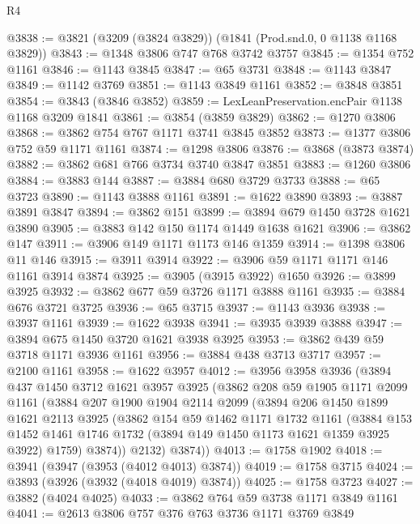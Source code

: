 \begin{lexlean}{R4}
\begin{coremodule}
@3838 := @3821 (@3209 (@3824 @3829)) (@1841 (Prod.snd.{0, 0} @1138 @1168 @3829))
@3843 := @1348 @3806 @747 @768 @3742 @3757
@3845 := @1354 @752 @1161
@3846 := @1143 @3845
@3847 := @65 @3731
@3848 := @1143 @3847
@3849 := @1142 @3769
@3851 := @1143 @3849 @1161
@3852 := @3848 @3851
@3854 := @3843 (@3846 @3852)
@3859 := LexLeanPreservation.encPair @1138 @1168 @3209 @1841
@3861 := @3854 (@3859 @3829)
@3862 := @1270 @3806
@3868 := @3862 @754 @767 @1171 @3741 @3845 @3852
@3873 := @1377 @3806 @752 @59 @1171 @1161
@3874 := @1298 @3806
@3876 := @3868 (@3873 @3874)
@3882 := @3862 @681 @766 @3734 @3740 @3847 @3851
@3883 := @1260 @3806
@3884 := @3883 @144
@3887 := @3884 @680 @3729 @3733
@3888 := @65 @3723
@3890 := @1143 @3888 @1161
@3891 := @1622 @3890
@3893 := @3887 @3891 @3847
@3894 := @3862 @151
@3899 := @3894 @679 @1450 @3728 @1621 @3890
@3905 := @3883 @142 @150 @1174 @1449 @1638 @1621
@3906 := @3862 @147
@3911 := @3906 @149 @1171 @1173 @146 @1359
@3914 := @1398 @3806 @11 @146
@3915 := @3911 @3914
@3922 := @3906 @59 @1171 @1171 @146 @1161 @3914 @3874
@3925 := @3905 (@3915 @3922) @1650
@3926 := @3899 @3925
@3932 := @3862 @677 @59 @3726 @1171 @3888 @1161
@3935 := @3884 @676 @3721 @3725
@3936 := @65 @3715
@3937 := @1143 @3936
@3938 := @3937 @1161
@3939 := @1622 @3938
@3941 := @3935 @3939 @3888
@3947 := @3894 @675 @1450 @3720 @1621 @3938 @3925
@3953 := @3862 @439 @59 @3718 @1171 @3936 @1161
@3956 := @3884 @438 @3713 @3717
@3957 := @2100 @1161
@3958 := @1622 @3957
@4012 := @3956
    @3958
    @3936
    (@3894
      @437
      @1450
      @3712
      @1621
      @3957
      @3925
      (@3862
        @208
        @59
        @1905
        @1171
        @2099
        @1161
        (@3884
          @207
          @1900
          @1904
          @2114
          @2099
          (@3894
            @206
            @1450
            @1899
            @1621
            @2113
            @3925
            (@3862
              @154
              @59
              @1462
              @1171
              @1732
              @1161
              (@3884
                @153
                @1452
                @1461
                @1746
                @1732
                (@3894 @149 @1450 @1173 @1621 @1359 @3925 @3922)
                @1759)
              @3874))
          @2132)
        @3874))
@4013 := @1758 @1902
@4018 := @3941 (@3947 (@3953 (@4012 @4013) @3874))
@4019 := @1758 @3715
@4024 := @3893 (@3926 (@3932 (@4018 @4019) @3874))
@4025 := @1758 @3723
@4027 := @3882 (@4024 @4025)
@4033 := @3862 @764 @59 @3738 @1171 @3849 @1161
@4041 := @2613 @3806 @757 @376 @763 @3736 @1171 @3769 @3849

\end{coremodule}
\end{lexlean}
